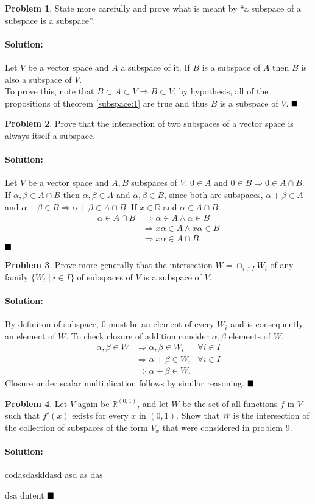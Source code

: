 \documentclass[]{article}
\newcommand{\RR}{\mathbb{R}}
\theoremstyle{definition}
\newtheorem{problem}{Problem}
\newenvironment{solution}{\paragraph{Solution:}}{\hfill$\blacksquare \\$}
\begin{document}
\begin{problem}
State more carefully and prove what is meant by ``a subspace of a subspace is a subspace''.	
\end{problem}
\begin{solution}
	Let $V$ be a vector space and $A$ a subspace of it. If $B$ is a subspace of $A$ then $B$ is also a subspace of $V$.
	\\
	To prove this, note that $B \subset A \subset V \Rightarrow B \subset V$, by hypothesis, all of the propositions of theorem \ref{subspace:1} are true and thus $B$ is a subspace of $V$.
\end{solution}
\begin{problem}
Prove that the intersection of two subspaces of a vector space is always itself a subspace.	
\end{problem}
\begin{solution}
Let $V$ be a vector space and $A,B$ subspaces of $V$. $0 \in A$ and $0 \in B \Rightarrow 0 \in A \cap B$. If $\alpha,\beta \in A \cap B$ then $\alpha,\beta \in A$ and $\alpha, \beta \in B$, since both are subspaces, $\alpha+\beta \in A$ and $\alpha + \beta \in B \Rightarrow \alpha+\beta \in A \cap B$. If $x \in \RR$ and $\alpha \in A \cap B$.
\begin{align*}
\alpha \in A \cap B & \Rightarrow \alpha \in A \wedge \alpha \in B \\
& \Rightarrow x\alpha \in A \wedge x\alpha \in B \\
& \Rightarrow x\alpha \in A \cap B.
\end{align*} 
\end{solution}
\begin{problem}
Prove more generally that the intersection $W = \cap_{i\in I} W_i$ of any family $\{W_i \mid i \in I \}$ of subspaces of $V$ is a subspace of $V$.
\end{problem}
\begin{solution}
	By definiton of subspace, $0$ must be an element of every $W_i$ and is consequently an element of $W$. To check closure of addition consider $\alpha, \beta$ elements of $W$,
	\begin{align*}
	\alpha, \beta \in W & \Rightarrow \alpha, \beta \in W_i & \forall i \in I \\
	& \Rightarrow \alpha + \beta \in W_i & \forall i \in I \\
	& \Rightarrow \alpha + \beta \in W.
	\end{align*}
	Closure under scalar multiplication follows by similar reasoning. 
\end{solution}
\begin{problem}
Let $V$ again be $\RR^{(0,1)}$, and let $W$ be the set of all functions $f$ in $V$ such that $f'(x)$ exists for every $x$ in $(0,1)$. Show that $W$ is the intersection of the collection of subspaces of the form $V_x$ that were considered in problem 9.	
\end{problem}
\begin{solution}
codasdaskldasd
asd
as
das

dsa
dntent	
\end{solution}
\end{document}
